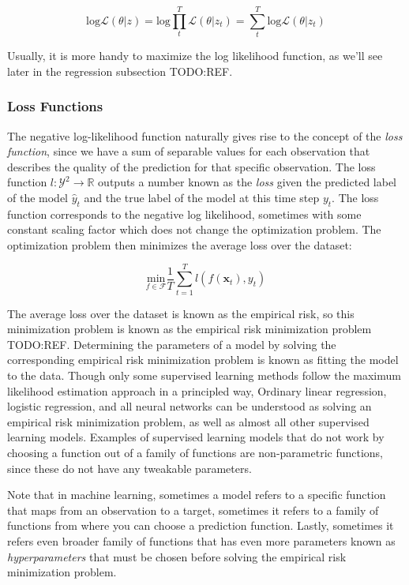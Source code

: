 \begin{equation}
  \text{log} \mathcal L(\theta | z) = \text{log} \prod_t^T \mathcal L(\theta | z_t) = \sum_t^T \text{log} \mathcal L(\theta | z_t)
\end{equation}

Usually, it is more handy to maximize the log likelihood function, as we'll see
later in the regression subsection TODO:REF.

\subsubsection{Loss Functions}

The negative log-likelihood function naturally gives rise to the concept of the
\emph{loss function}, since we have a sum of separable values for each
observation that describes the quality of the prediction for that specific
observation. The loss function $l : \mathcal Y^2 \rightarrow \mathbb R$ outputs
a number known as the \emph{loss} given the predicted label of the model $\hat
y_t$ and the true label of the model at this time step $y_t$. The loss function
corresponds to the negative log likelihood, sometimes with some constant
scaling factor which does not change the optimization problem. The optimization
problem then minimizes the average loss over the dataset:

\begin{equation}
  \underset{f \in \mathcal F}{\text{min}} \frac 1 T \sum_{t=1}^T l(f(\mathbf{x}_t), y_t)
\end{equation}

The average loss over the dataset is known as the empirical risk, so this
minimization problem is known as the empirical risk minimization problem
TODO:REF. Determining the parameters of a model by solving the corresponding
empirical risk minimization problem is known as fitting the model to the data.
Though only some supervised learning methods follow the maximum likelihood
estimation approach in a principled way, Ordinary linear regression, logistic
regression, and all neural networks can be understood as solving an empirical
risk minimization problem, as well as almost all other supervised learning
models. Examples of supervised learning models that do not work by choosing a
function out of a family of functions are non-parametric functions, since these
do not have any tweakable parameters.

Note that in machine learning, sometimes a model refers to a specific function
that maps from an observation to a target, sometimes it refers to a family of
functions from where you can choose a prediction function. Lastly, sometimes it
refers even broader family of functions that has even more parameters known as
\emph{hyperparameters} that must be chosen before solving the empirical risk
minimization problem.

